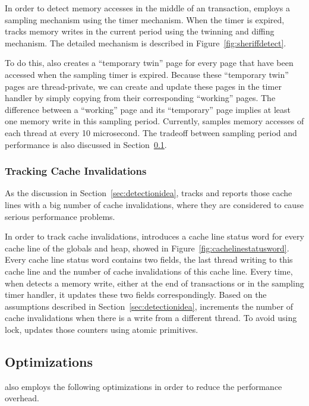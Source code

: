 In order to detect memory accesses in the middle of an transaction, \SheriffDetect{} employs a sampling mechanism using the timer mechanism. When the timer is expired, \SheriffDetect{} tracks memory writes in the current period using the twinning and diffing mechanism. The detailed mechanism is described in Figure~\ref{fig:sheriffdetect}. 

To do this, \SheriffDetect{} also creates a ``temporary twin'' page for every page that have been accessed when the sampling timer is expired. Because these ``temporary twin'' pages are thread-private, we can create and update these pages in the timer handler by simply copying from their corresponding ``working'' pages. The difference between a ``working'' page and its ``temporary'' page implies at least one memory write in this sampling period. Currently, \SheriffDetect{} samples memory accesses of each thread at every 10 microsecond. The tradeoff between sampling period and performance is also discussed in Section~\ref{}. 

\subsubsection{Tracking Cache Invalidations}
\label{sec:invalidation}
As the discussion in Section~\ref{sec:detectionidea}, \SheriffDetect{} tracks and reports those cache lines with a big number of cache invalidations, where they are considered to cause serious performance problems. 

In order to track cache invalidations, \SheriffDetect{} introduces a cache line status word for every cache line of the globals and heap, showed in Figure~\ref{fig:cachelinestatusword}.  Every cache line status word contains two fields, the last thread writing to this cache line and the number of cache invalidations of this cache line. 
Every time, when \SheriffDetect{} detects a memory write, either at the end of transactions or in the sampling timer handler,  it updates these two fields correspondingly. Based on the assumptions described in Section~\ref{sec:detectionidea}, \SheriffDetect{} increments the number of cache invalidations when there is a write from a different thread. To avoid using lock, \SheriffDetect{} updates those counters using atomic primitives. 

\subsection{Optimizations}

\SheriffDetect{} also employs the following optimizations in order to reduce the performance overhead. 

